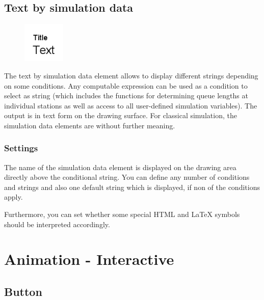 \section{Text by simulation data}
\label{ref:ModelElementAnimationTextSelect}

\begin{figure}
\vspace{-22pt}
\includegraphics[width=2cm]{imageModelElementAnimationTextSelect.png}
\vspace{-22pt}
\end{figure}

The text by simulation data element allows to display different strings depending on some conditions.
Any computable expression can be used as a condition to select as string (which includes the functions for
determining queue lengths at individual stations as well as access to all user-defined simulation
variables). The output is in text form on the drawing surface. For classical simulation, the simulation
data elements are without further meaning.

\subsection*{Settings}

The name of the simulation data element is displayed on the drawing area directly above the conditional string.
You can define any number of conditions and strings and also one default string which is displayed,
if non of the conditions apply.

Furthermore, you can set whether some special HTML and LaTeX symbols should
be interpreted accordingly.





\chapter{Animation - Interactive}

\section{Button}
\label{ref:ModelElementInteractiveButton}

